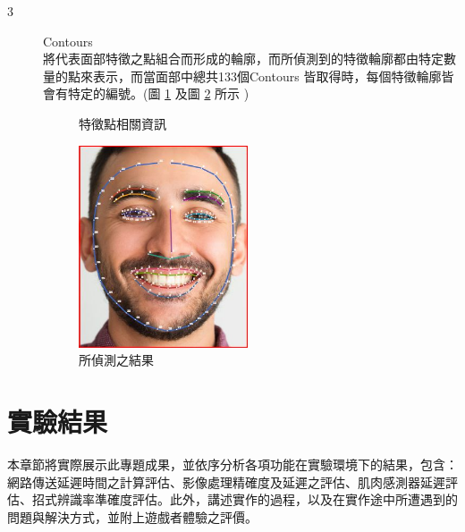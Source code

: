 \documentclass[12pt]{article}  %
\theoremstyle{plain}
\begin{document}
\begin{itemize}
\begin{description}
\item[3] Contours \\
將代表面部特徵之點組合而形成的輪廓，而所偵測到的特徵輪廓都由特定數量的點來表示，而當面部中總共133個Contours 皆取得時，每個特徵輪廓皆會有特定的編號。(圖 \ref{特徵點相關資訊} 及圖 \ref{所偵測之結果} 所示 )
\begin{figure}[htbp]
\quad
{}
\caption{特徵點相關資訊} \label{特徵點相關資訊}
\end{figure}
\begin{figure}[htbp]
\centering
\includegraphics[width=5cm]{pic/ch3/face_contours.JPG}
\caption{所偵測之結果} \label{所偵測之結果}
\end{figure}

\end{description}
\end{itemize}
\newpage

\section{實驗結果}
本章節將實際展示此專題成果，並依序分析各項功能在實驗環境下的結果，包含：網路傳送延遲時間之計算評估、影像處理精確度及延遲之評估、肌肉感測器延遲評估、招式辨識率準確度評估。此外，講述實作的過程，以及在實作途中所遭遇到的問題與解決方式，並附上遊戲者體驗之評價。
\end{document}
